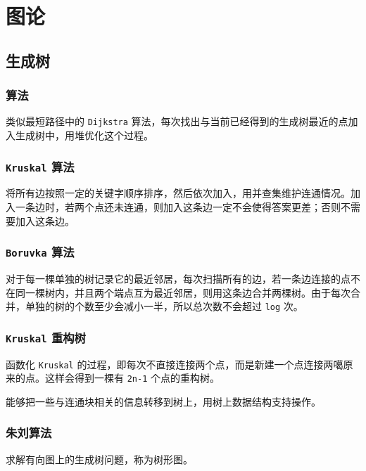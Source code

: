 \documentclass[UTF-8]{ctexart}
\begin{document}
\section{图论}
	\subsection{生成树}
	\subsubsection{ 算法}
	类似最短路径中的 \texttt{Dijkstra} 算法，每次找出与当前已经得到的生成树最近的点加入生成树中，用堆优化这个过程。
	\subsubsection{\texttt{Kruskal} 算法}
	将所有边按照一定的关键字顺序排序，然后依次加入，用并查集维护连通情况。加入一条边时，若两个点还未连通，则加入这条边一定不会使得答案更差；否则不需要加入这条边。
	\subsubsection{\texttt{Boruvka} 算法}
	对于每一棵单独的树记录它的最近邻居，每次扫描所有的边，若一条边连接的点不在同一棵树内，并且两个端点互为最近邻居，则用这条边合并两棵树。由于每次合并，单独的树的个数至少会减小一半，所以总次数不会超过 \texttt{log} 次。
	\subsubsection{\texttt{Kruskal} 重构树}
	函数化 \texttt{Kruskal} 的过程，即每次不直接连接两个点，而是新建一个点连接两噶原来的点。这样会得到一棵有 \texttt{2n-1} 个点的重构树。
	
	能够把一些与连通块相关的信息转移到树上，用树上数据结构支持操作。
	\subsubsection{朱刘算法}
	求解有向图上的生成树问题，称为树形图。
	
\end{document}
